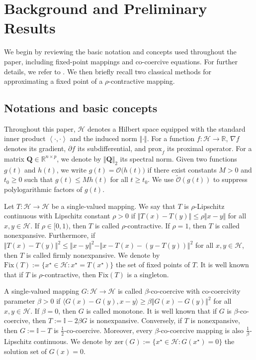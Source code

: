 \documentclass{article}
\theoremstyle{plain}
\theoremstyle{definition}
\newcommand{\Id}{\mathbb{I}}
\newcommand{\R}{\mathbb{R}}
\newcommand{\Hil}{\mathcal{H}}
\newcommand{\sets}[1]{\{#1\}}
\newcommand{\norms}[1]{\Vert#1\Vert}
\newcommand{\prox}{\mathrm{prox}}
\newcommand{\mcal}[1]{\mathcal{#1}}
\newcommand{\iprod}[1]{\left\langle #1\right\rangle}
\newcommand{\iprods}[1]{\langle #1\rangle}
\newcommand{\0}{\boldsymbol{0}}
\newcommand{\BigOs}[1]{\mathcal{O}\big(#1\big)}
\newcommand{\mbf}[1]{\mathbf{#1}}
\begin{document}
\section{Background and Preliminary Results}\label{sec:prelim_results}
We begin by reviewing the basic notation and concepts used throughout the paper, including fixed-point mappings and co-coercive equations. 
For further details, we refer to \cite{Bauschke2011,Facchinei2003}.
We then briefly recall two classical methods for approximating a fixed point of a $\rho$-contractive mapping.

\subsection{Notations and basic concepts}\label{sec:notation}
Throughout this paper, $\Hil$ denotes a Hilbert space equipped with the standard inner product $\iprod{\cdot,\cdot}$ and the induced norm $\norms{\cdot}$.
For a function $f : \Hil \to\R$, $\nabla{f}$ denotes its gradient, $\partial{f}$ its subdifferential, and $\prox_{f}$ its proximal operator.
For a matrix $\mbf{Q}\in\R^{n\times p}$, we denote by $\norms{\mbf{Q}}_2$ its spectral norm.
Given two functions $g(t)$ and $h(t)$, we write $g(t) = \BigOs{h(t)}$ if there exist constants $M > 0$ and $t_0 \geq 0$ such that $g(t) \leq Mh(t)$ for all $t \geq t_0$.
We use $\widetilde{\mcal{O}}(g(t))$ to suppress polylogarithmic factors of $g(t)$.

Let $T : \Hil \to \Hil$ be a single-valued mapping.
We say that $T$ is $\rho$-Lipschitz continuous with Lipschitz constant $\rho > 0$ if $\norms{T(x) - T(y)} \leq \rho\norms{x - y}$ for all $x, y \in \Hil$.
If $\rho \in [0, 1)$, then $T$ is called $\rho$-contractive.
If $\rho = 1$, then $T$ is called nonexpansive.
Furthermore, if $\norms{T(x) - T(y)}^2 \leq \norms{x - y}^2 - \norms{x - T(x) - (y - T(y))}^2$ for all $x, y \in \Hil$, then $T$ is called firmly nonexpansive.
We denote by $\textrm{Fix}(T) := \sets{x^{\star} \in \Hil : x^{\star} = T(x^{\star})}$ the set of fixed points of $T$.
It is well known that if $T$ is $\rho$-contractive, then $\textrm{Fix}(T)$ is a singleton.

A single-valued mapping $G : \Hil \to \Hil$ is called $\beta$-co-coercive with co-coercivity parameter $\beta > 0$ if $\iprods{G(x) - G(y), x - y} \geq \beta\norms{G(x) - G(y)}^2$ for all $x, y \in \Hil$.
If $\beta = 0$, then $G$ is called monotone.
It is well known that if $G$ is $\beta$-co-coercive, then $T := \Id - 2\beta G$ is nonexpansive.
Conversely, if $T$ is nonexpansive, then $G := \Id - T$ is $\frac{1}{2}$-co-coercive.
Moreover, every $\beta$-co-coercive mapping is also $\frac{1}{\beta}$-Lipschitz continuous.
We denote by $\mathrm{zer}(G) := \sets{x^{\star} \in \Hil : G(x^{\star}) = 0}$ the solution set of  $G(x)=0$.
\end{document}
